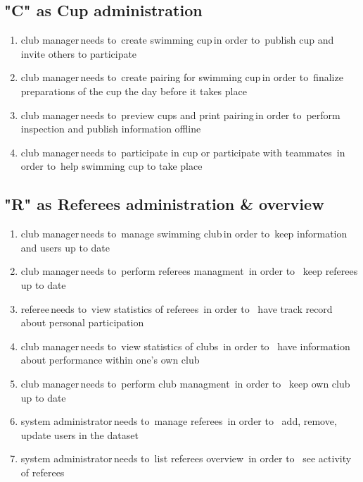 \subsection*{"C" as Cup administration}
\begin{enumerate}
    \item \lbrack club manager\rbrack \,needs to\, \lbrack create swimming cup\rbrack \,in order to\, \lbrack publish cup and invite others to participate\rbrack
    \item \lbrack club manager\rbrack \,needs to\, \lbrack create pairing for swimming cup\rbrack \,in order to\, \lbrack finalize preparations of the cup the day before it takes place\rbrack
    \item \lbrack club manager\rbrack \,needs to\, \lbrack preview cups and print pairing\rbrack \,in order to\, \lbrack perform inspection and publish information offline\rbrack
    \item \lbrack club manager\rbrack \,needs to\, \lbrack participate in cup or participate with teammates\rbrack \, in order to\, \lbrack help swimming cup to take place\rbrack
\end{enumerate} 
\subsection*{"R" as Referees administration \& overview}
\begin{enumerate}
\item \lbrack club manager\rbrack \,needs to\, \lbrack manage swimming club\rbrack \,in order to\, \lbrack keep information and users up to date\rbrack
\item \lbrack club manager\rbrack \,needs to\, \lbrack perform referees managment\rbrack \, in order to \, \lbrack keep referees up to date\rbrack
\item \lbrack referee\rbrack \,needs to\, \lbrack view statistics of referees\rbrack \, in order to \, \lbrack have track record about personal participation\rbrack
\item \lbrack club manager\rbrack \,needs to\, \lbrack view statistics of clubs\rbrack \, in order to \, \lbrack have information about performance within one's own club\rbrack
\item \lbrack club manager\rbrack \,needs to\, \lbrack perform club managment\rbrack \, in order to \, \lbrack keep own club up to date\rbrack
\item \lbrack system administrator\rbrack \,needs to\, \lbrack manage referees\rbrack \, in order to \, \lbrack add, remove, update users in the dataset\rbrack
\item \lbrack system administrator\rbrack \,needs to\, \lbrack list referees overview\rbrack \, in order to \, \lbrack see activity of referees\rbrack
\end{enumerate} 
